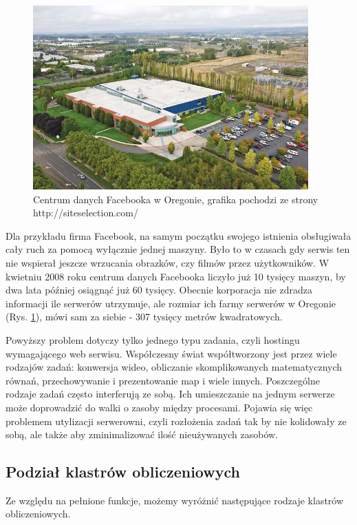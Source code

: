 \documentclass[10pt,a4paper,titlepage,twoside]{report}
\begin{document}
\begin{figure}[ht!]
	\centering
	\includegraphics[scale=0.7]{pics/Selection_615.png} 
	\caption{Centrum danych Facebooka w Oregonie, grafika pochodzi ze strony http://siteselection.com/}
	\label{facebook_dc}
\end{figure}


Dla przykładu firma Facebook, na samym początku swojego istnienia obsługiwała cały ruch za pomocą wyłącznie jednej maszyny\cite{ad4}. Było to w czasach gdy serwis ten nie wspierał jeszcze wrzucania obrazków, czy filmów przez użytkowników. W kwietniu 2008 roku centrum danych Facebooka liczyło już 10 tysięcy maszyn, by dwa lata później osiągnąć już 60 tysięcy. Obecnie korporacja nie zdradza informacji ile serwerów utrzymuje, ale rozmiar ich farmy serwerów w Oregonie (Rys. \ref{facebook_dc}), mówi sam za siebie - 307 tysięcy metrów kwadratowych\cite{ad5}.

Powyższy problem dotyczy tylko jednego typu zadania, czyli hostingu wymagającego web serwisu. Współczesny świat współtworzony jest przez wiele rodzajów zadań: konwersja wideo, obliczanie skomplikowanych matematycznych równań, przechowywanie i prezentowanie map i wiele innych. Poszczególne rodzaje zadań często interferują ze sobą. Ich umieszczanie na jednym serwerze może doprowadzić do walki o zasoby między procesami. Pojawia się więc problemem utylizacji serwerowni, czyli rozłożenia zadań tak by nie kolidowały ze sobą, ale także aby zminimalizować ilość nieużywanych zasobów\cite{ad5}.

\subsection{Podział klastrów obliczeniowych}\indent \indent Ze względu na pełnione funkcje, możemy wyróżnić następujące rodzaje klastrów obliczeniowych\cite{ad6}.
\end{document}
